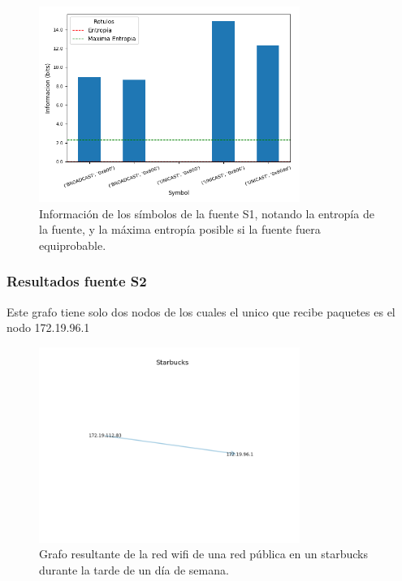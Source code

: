 \begin{figure}[H]
  \centering
  \includegraphics[width=8.5cm]{figs/information_starbucks_S1_output.png}
  \caption{\normalfont Información de los símbolos de la fuente S1, notando la entropía de la fuente, y la máxima entropía posible si la fuente fuera equiprobable.}
\end{figure}

\subsubsection*{Resultados fuente S2}

Este grafo tiene solo dos nodos de los cuales el unico que recibe paquetes es el nodo 172.19.96.1

\begin{figure}[H]
 \centering
	\includegraphics[width=8.5cm]{figs/starbucks.png}
	\caption{Grafo resultante de la red wifi de una red pública en un starbucks durante la tarde de un día de semana.}
	\label{fig:domicilio-grafo}
\end{figure}
